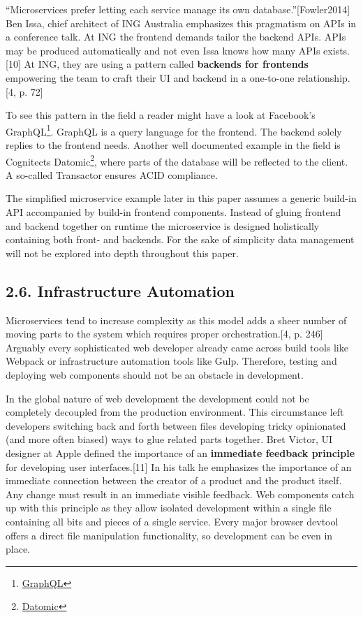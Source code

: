 \documentclass[]{article}
\begin{document}
``Microservices prefer letting each service manage its own
database.''{[}Fowler2014{]} Ben Issa, chief architect of ING Australia
emphasizes this pragmatism on APIs in a conference talk. At ING the
frontend demands tailor the backend APIs. APIs may be produced
automatically and not even Issa knows how many APIs exists.{[}10{]} At
ING, they are using a pattern called \textbf{backends for frontends}
empowering the team to craft their UI and backend in a one-to-one
relationship.{[}4, p. 72{]}

To see this pattern in the field a reader might have a look at
Facebook's GraphQL\footnote{\href{http://graphql.org/}{GraphQL}}.
GraphQL is a query language for the frontend. The backend solely replies
to the frontend needs. Another well documented example in the field is
Cognitects Datomic\footnote{\href{http://www.datomic.com/}{Datomic}},
where parts of the database will be reflected to the client. A so-called
Transactor ensures ACID compliance.

The simplified microservice example later in this paper assumes a
generic build-in API accompanied by build-in frontend components.
Instead of gluing frontend and backend together on runtime the
microservice is designed holistically containing both front- and
backends. For the sake of simplicity data management will not be
explored into depth throughout this paper.

\subsection{2.6. Infrastructure
Automation}\label{infrastructure-automation}

Microservices tend to increase complexity as this model adds a sheer
number of moving parts to the system which requires proper
orchestration.{[}4, p. 246{]} Arguably every sophisticated web developer
already came across build tools like Webpack or infrastructure
automation tools like Gulp. Therefore, testing and deploying web
components should not be an obstacle in development.

In the global nature of web development the development could not be
completely decoupled from the production environment. This circumstance
left developers switching back and forth between files developing tricky
opinionated (and more often biased) ways to glue related parts together.
Bret Victor, UI designer at Apple defined the importance of an
\textbf{immediate feedback principle} for developing user
interfaces.{[}11{]} In his talk he emphasizes the importance of an
immediate connection between the creator of a product and the product
itself. Any change must result in an immediate visible feedback. Web
components catch up with this principle as they allow isolated
development within a single file containing all bits and pieces of a
single service. Every major browser devtool offers a direct file
manipulation functionality, so development can be even in place.
\end{document}
